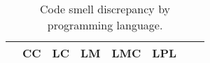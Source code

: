 \begin{table}[t]
    \centering
    \caption{
        \label{tab:occurrence_table}
        Code smell discrepancy by programming language.
    }
    \renewcommand{\arraystretch}{1.2}
    \begin{tabular}{@{}lrrrrrrr@{}}
        \toprule
            {\bf }
            &
            {\bf CC}
            &
            {\bf LC}
            &
            {\bf LM}
            &
            {\bf LMC}
            &
            {\bf LPL}
            \\




        \bottomrule
        

    \end{tabular}

    \vspace{-1em}
\end{table}
